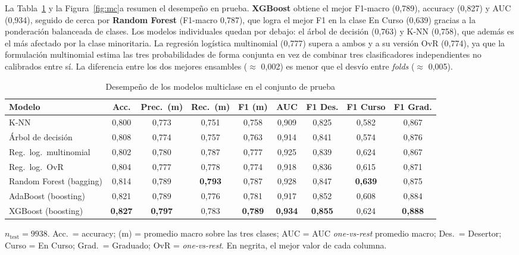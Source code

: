 \documentclass[titlepage,a4paper]{article}
\begin{document}
La Tabla~\ref{tab:multiclase} y la Figura~\ref{fig:mc}a resumen el desempeño en prueba. \textbf{XGBoost} obtiene el mejor F1-macro (0,789), accuracy (0,827) y AUC (0,934), seguido de cerca por \textbf{Random Forest} (F1-macro 0,787), que logra el mejor F1 en la clase En Curso (0,639) gracias a la ponderación balanceada de clases. Los modelos individuales quedan por debajo: el árbol de decisión (0,763) y K-NN (0,758), que además es el más afectado por la clase minoritaria. La regresión logística multinomial (0,777) supera a ambos y a su versión OvR (0,774), ya que la formulación multinomial estima las tres probabilidades de forma conjunta en vez de combinar tres clasificadores independientes no calibrados entre sí. La diferencia entre los dos mejores ensambles ($\approx$ 0,002) es menor que el desvío entre \textit{folds} ($\approx$ 0,005).

\begin{table}[!htbp]
\centering
\caption{Desempeño de los modelos multiclase en el conjunto de prueba}
\label{tab:multiclase}
\footnotesize
\setlength{\tabcolsep}{3.4pt}
\begin{tabular}{lcccccccc}
\toprule
\textbf{Modelo} & \textbf{Acc.} & \textbf{Prec.\ (m)} & \textbf{Rec.\ (m)} & \textbf{F1 (m)} & \textbf{AUC} & \textbf{F1 Des.} & \textbf{F1 Curso} & \textbf{F1 Grad.} \\
\midrule
K-NN                    & 0,800 & 0,773 & 0,751 & 0,758 & 0,909 & 0,825 & 0,582 & 0,867 \\
Árbol de decisión       & 0,808 & 0,774 & 0,757 & 0,763 & 0,914 & 0,841 & 0,574 & 0,876 \\
Reg.\ log.\ multinomial & 0,802 & 0,780 & 0,787 & 0,777 & 0,925 & 0,839 & 0,624 & 0,867 \\
Reg.\ log.\ OvR         & 0,804 & 0,777 & 0,778 & 0,774 & 0,918 & 0,836 & 0,615 & 0,871 \\
Random Forest (bagging) & 0,814 & 0,789 & \textbf{0,793} & 0,787 & 0,928 & 0,847 & \textbf{0,639} & 0,875 \\
AdaBoost (boosting)     & 0,821 & 0,789 & 0,776 & 0,781 & 0,917 & 0,852 & 0,608 & 0,884 \\
\rowcolor{orange!12}
XGBoost (boosting)      & \textbf{0,827} & \textbf{0,797} & 0,783 & \textbf{0,789} & \textbf{0,934} & \textbf{0,855} & 0,624 & \textbf{0,888} \\
\bottomrule
\end{tabular}

\vspace{2pt}
{\scriptsize $n_{\text{test}} = 9938$. Acc.\ = accuracy; (m) = promedio macro sobre las tres clases; AUC = AUC \textit{one-vs-rest} promedio macro; Des.\ = Desertor; Curso = En Curso; Grad.\ = Graduado; OvR = \textit{one-vs-rest}. En negrita, el mejor valor de cada columna.\par}
\end{table}
\end{document}

